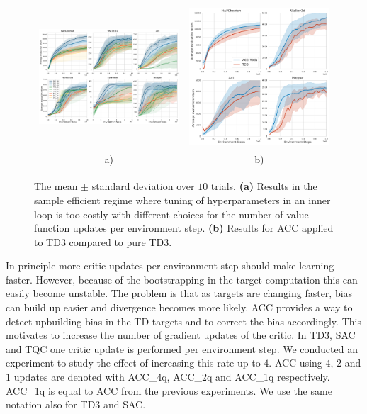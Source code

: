 \begin{figure}[t]
\footnotesize
\centering 
\begin{tabular}{cc}
    \includegraphics[width=.56\linewidth]{images/less_steps/results_sample_efficient_all_utds_size23.pdf} &
    \includegraphics[width=.39\linewidth]{images/main_exp/acc_td3.pdf} \\
    a) & b) \\
\end{tabular}
\vspace{-0.3cm}
\caption{
The mean $\pm$ standard deviation over $10$ trials. 
\textbf{(a)} Results in the sample efficient regime where tuning of hyperparameters in an inner loop is too costly with different choices for the number of value function updates per environment step.
\textbf{(b)} Results for ACC applied to TD3 compared to pure TD3.}
\label{fig:further_eval}
\vspace{-0.5cm}
\end{figure}




In principle more critic updates per environment step should make learning faster. However, because of the bootstrapping in the target computation this can easily become unstable.
The problem is that as targets are changing faster, bias can build up easier and divergence becomes more likely.
ACC provides a way to detect upbuilding bias in the TD targets and to correct the bias accordingly.
This motivates to increase the number of gradient updates of the critic.
In TD3, SAC and TQC one critic update is performed per environment step.
We conducted an experiment to study the effect of increasing this rate up to $4$.
ACC using $4$, $2$ and $1$ updates are denoted with ACC\_4q, ACC\_2q and ACC\_1q respectively. ACC\_1q is equal to ACC from the previous experiments. We use the same notation also for TD3 and SAC.

